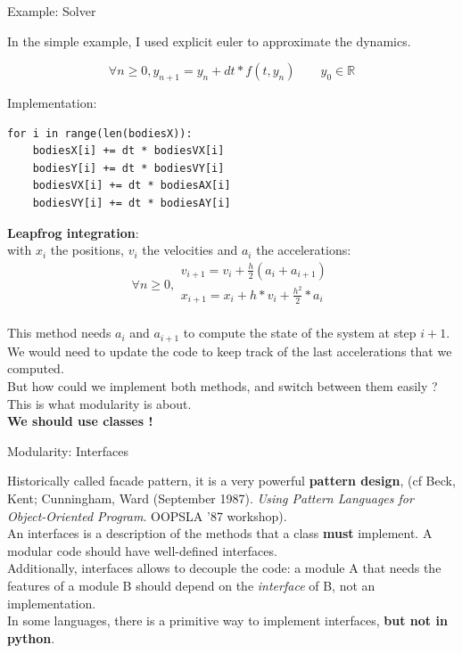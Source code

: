 \documentclass[colorlinks]{beamer}
\begin{document}
\begin{frame}{Example: Solver}

    In the simple example, I used explicit euler to approximate the dynamics.

    \[\forall n \geq 0, y_{n+1} = y_n + dt * f(t, y_n) \quad \quad y_0 \in \mathbb{R}\]

    Implementation:  
    \begin{verbatim}
for i in range(len(bodiesX)):
    bodiesX[i] += dt * bodiesVX[i]
    bodiesY[i] += dt * bodiesVY[i]
    bodiesVX[i] += dt * bodiesAX[i]
    bodiesVY[i] += dt * bodiesAY[i]
    \end{verbatim}

    \framebreak
    
    \textbf{Leapfrog integration}:\\
    with $x_i$ the positions, $v_i$ the velocities and $a_i$ the accelerations: 
    \[\forall n \geq 0, 
    \begin{array}{l}
        v_{i+1} = v_i + \frac{h}{2} (a_i + a_{i+1}) \\
        x_{i+1} = x_i + h * v_i + \frac{h^2}{2} * a_i \\
    \end{array}\]

    This method needs $a_i$ and $a_{i+1}$ to compute the state of the system at step $i+1$. We would need to update the code to keep track of the last accelerations that we computed.\\

    But how could we implement both methods, and switch between them easily ? This is what modularity is about.\\
    \textbf{We should use classes !}

\end{frame}

\begin{frame}{Modularity: Interfaces}
    
    Historically called facade pattern, it is a very powerful \textbf{pattern design}, (cf Beck, Kent; Cunningham, Ward (September 1987). \textit{Using Pattern Languages for Object-Oriented Program}. OOPSLA '87 workshop).\\
    
    An interfaces is a description of the methods that a class \textbf{must} implement. A modular code should have well-defined interfaces.\\
    Additionally, interfaces allows to decouple the code: a module A that needs the features of a module B should depend on the \emph{interface} of B, not an implementation.\\
    
    In some languages, there is a primitive way to implement interfaces, \textbf{but not in python}.
\end{frame}
    
\end{document}
